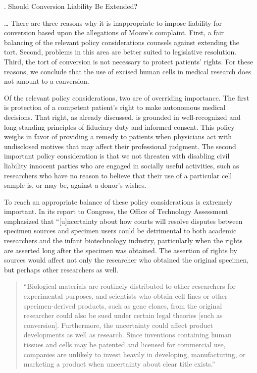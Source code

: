 {. Should Conversion Liability Be Extended\textbf{?}
\par}

{\dots} There are three reasons why it is inappropriate to impose liability for
conversion based upon the allegations of Moore's complaint. First, a fair
balancing of the relevant policy considerations counsels against extending the
tort. Second, problems in this area are better suited to legislative
resolution. Third, the tort of conversion is not necessary to protect patients'
rights. For these reasons, we conclude that the use of excised human cells in
medical research does not amount to a conversion.

Of the relevant policy considerations, two are of overriding importance. The
first is protection of a competent patient's right to make autonomous medical
decisions. That right, as already discussed, is grounded in well-recognized and
long-standing principles of fiduciary duty and informed consent. This policy
weighs in favor of providing a remedy to patients when physicians act with
undisclosed motives that may affect their professional judgment. The second
important policy consideration is that we not threaten with disabling civil
liability innocent parties who are engaged in socially useful activities, such
as researchers who have no reason to believe that their use of a particular
cell sample is, or may be, against a donor's wishes.

To reach an appropriate balance of these policy considerations is extremely
important. In its report to Congress, the Office of Technology Assessment
emphasized that ``[u]ncertainty about how courts will resolve disputes between
specimen sources and specimen users could be detrimental to both academic
researchers and the infant biotechnology industry, particularly when the rights
are asserted long after the specimen was obtained. The assertion of rights by
sources would affect not only the researcher who obtained the original
specimen, but perhaps other researchers as well.

\begin{quote}
{}``Biological materials are routinely distributed to other researchers for
experimental purposes, and scientists who obtain cell lines or other
specimen-derived products, such as gene clones, from the original researcher
could also be sued under certain legal theories [such as conversion].
Furthermore, the uncertainty could affect product developments as well as
research. Since inventions containing human tissues and cells may be patented
and licensed for commercial use, companies are unlikely to invest heavily in
developing, manufacturing, or marketing a product when uncertainty about clear
title exists.'' 
\end{quote}

